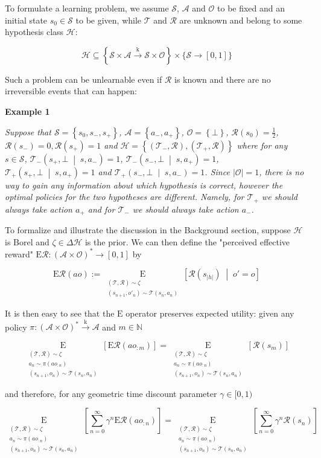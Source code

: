 \documentclass[a4paper]{article}
\newcommand{\Co}[1]{}
\newcommand{\AP}[1]{\left(#1\right)}
\newcommand{\AB}[1]{\left[#1\right]}
\newcommand{\AC}[1]{\left\{#1\right\}}
\newcommand{\APM}[2]{\left(#1\;\middle\vert\;#2\right)}
\newcommand{\ABM}[2]{\left[#1\;\middle\vert\;#2\right]}
\newcommand{\Ea}[2]{\underset{#1}{\operatorname{E}}\AB{#2}}
\newcommand{\CE}[3]{\underset{#1}{\operatorname{E}}\ABM{#2}{#3}}
\newcommand{\Nats}{\mathbb{N}}
\newcommand{\Abs}[1]{\left\vert #1 \right\vert}
\newcommand{\K}{\xrightarrow{\mathrm{k}}}
\newcommand{\St}{\mathcal{S}}
\newcommand{\A}{\mathcal{A}}
\newcommand{\Ob}{\mathcal{O}}
\newcommand{\FH}{\AP{\A\times\Ob}^*}
\newcommand{\R}{\mathcal{R}}
\newcommand{\T}{\mathcal{T}}
\newcommand{\Hy}{\mathcal{H}}
\newcommand{\ER}{\mathrm{E}}
\begin{document}
To formulate a learning problem, we assume $\St$, $\A$ and $\Ob$ to be fixed and an initial state $s_0\in\St$ to be given, while $\T$ and $\R$ are unknown and belong to some hypothesis class $\Hy$:

$$\Hy\subseteq\AC{\St\times\A\K\St\times\Ob}\times\bigg\{\St\rightarrow[0,1]\bigg\}$$

Such a problem can be unlearnable even if $\R$ is known and there are no irreversible events that can happen:

\textbf{Example 1}\Co{b}

\textit{Suppose that $\St=\AC{s_0,s_-,s_+}$, $\A=\AC{a_-,a_+}$, $\Ob=\AC{\bot}$, $\R\AP{s_0}=\frac{1}{2}$, $\R\AP{s_-}=0, \R\AP{s_+}=1$ and $\Hy=\AC{\AP{\T_-,\R},\AP{\T_+,\R}}$ where for any $s\in\St$, $\T_-\APM{s_+,\bot}{s,a_-}=1$, $\T_-\APM{s_-,\bot}{s,a_+}=1$, $\T_+\APM{s_+,\bot}{s,a_+}=1$ and $\T_+\APM{s_-,\bot}{s,a_-}=1$. Since $\Abs{\Ob}=1$, there is no way to gain any information about which hypothesis is correct, however the optimal policies for the two hypotheses are different. Namely, for $\T_+$ we should always take action $a_+$ and for $\T_-$ we should always take action $a_-$.}\Co{i}

To formalize and illustrate the discussion in the Background section, suppose $\Hy$ is Borel and $\zeta\in\Delta\Hy$ is the prior. We can then define the "perceived effective reward" $\ER\R:\FH\rightarrow[0,1]$ by

$$\ER\R(ao):=\CE{\substack{(\T,\R)\sim\zeta\\\AP{s_{n+1},o'_n}\sim\T\AP{s_n,a_n}}}{\R\AP{s_{\Abs{h}}}}{o'=o}$$

It is then easy to see that the $\ER$ operator preserves expected utility: given any policy $\pi:\FH\K \A$ and $m\in\Nats$

$$\Ea{\substack{(\T,\R)\sim\zeta\\a_n\sim\pi\AP{ao_{:n}}\\\AP{s_{n+1},o_n}\sim\T\AP{s_n,a_n}}}{\ER\R\AP{ao_{:m}}}=\Ea{\substack{(\T,\R)\sim\zeta\\a_n\sim\pi\AP{ao_{:n}}\\\AP{s_{n+1},o_n}\sim\T\AP{s_n,a_n}}}{\R\AP{s_m}}$$

and therefore, for any geometric time discount parameter $\gamma\in[0,1)$

$$\Ea{\substack{(\T,\R)\sim\zeta\\a_n\sim\pi\AP{ao_{:n}}\\\AP{s_{n+1},o_n}\sim\T\AP{s_n,a_n}}}{\sum_{n=0}^\infty\gamma^n\ER\R\AP{ao_{:n}}}=\Ea{\substack{(\T,\R)\sim\zeta\\a_n\sim\pi\AP{ao_{:n}}\\\AP{s_{n+1},o_n}\sim\T\AP{s_n,a_n}}}{\sum_{n=0}^\infty\gamma^n\R\AP{s_n}}$$
\end{document}
